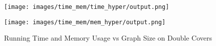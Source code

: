 
\begin{figure*}[htbp]


\begin{minipage}[b]{0.3\textwidth}
			\centering
			\texttt{[image: images/time\_mem/time\_hyper/output.png]} %
			
		\end{minipage}%
		\begin{minipage}[b]{0.3\textwidth}
			\centering
			\texttt{[image: images/time\_mem/mem\_hyper/output.png]} %
		\end{minipage}%
	
	
		\caption{Running Time and Memory Usage vs Graph Size on Double Covers}
\label{fig:time_mem_double}
\end{figure*}





